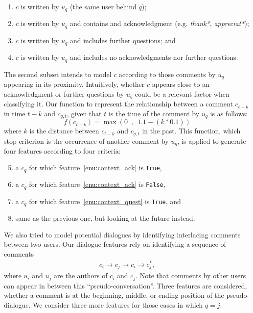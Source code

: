 \begin{enumerate}
\item $c$ is written by $u_q$ (\ie the same user behind $q$); 
\item \label{enu:context_ack} 
  $c$ is written by $u_q$ and contains and acknowledgment (e.g.   
  \textit{thank*}, \textit{appreciat*});
\item \label{enu:context_quest}
  $c$ is written by $u_q$ and includes further questions; and
\item $c$ is written by $u_q$ and includes no acknowledgments nor further 
questions.
\end{enumerate}
% 
The second subset intends to model $c$ according to those comments by $u_q$ 
appearing in its proximity. Intuitively, whether $c$ appears close to an 
acknowledgment or further questions by $u_q$ could be a relevant factor when 
classifying it. Our function to represent the relationship between a comment 
$c_{t-k}$ in time $t-k$ and $c_{q,t}$, given that $t$ is the 
time of the comment by $u_q$ is as follows:
% 
\begin{equation}
 f(c_{t-k})=\max \left(0\enspace,\enspace 1.1-(k*0.1) \right)
\end{equation}
%
where $k$ is the distance between $c_{t-k}$ and $c_{q,t}$ in the past. This 
function, which stop criterion is the occurrence of another comment by $u_q$, 
is applied to generate four features according to four criteria:

\begin{enumerate}\setcounter{enumi}{4}
\item a $c_q$ for which feature~\ref{enu:context_ack} is \texttt{True},
\item a $c_q$ for which feature~\ref{enu:context_ack} is \texttt{False}, 
\item a $c_q$ for which feature~\ref{enu:context_quest} is \texttt{True}, and 
\item same as the previous one, but looking at the future instead. 
\end{enumerate}


We also tried to model potential dialogues by identifying interlacing comments 
between two users. Our dialogue features rely on identifying 
a sequence of comments 
\begin{align*}
c_i \rightarrow c_j \rightarrow c_i \rightarrow c_j^*,
\end{align*}
% 
where $u_i$ and $u_j$ are the authors of $c_i$ and $c_j$. 
Note that comments by other 
users can appear in between this ``pseudo-conversation''. Three features are 
considered, whether a comment is at the beginning, middle, or ending position of 
the pseudo-dialogue. We consider three more features for those cases in which 
$q=j$. 


